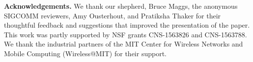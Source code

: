 
\medskip
\noindent
\textbf{Acknowledgements.} We thank our shepherd, Bruce Maggs, the anonymous
SIGCOMM reviewers, Amy Ousterhout, and Pratiksha Thaker for their thoughtful
feedback and suggestions that improved the presentation of the paper. This work
was partly supported by NSF grants CNS-1563826 and CNS-1563788. We thank the
industrial partners of the MIT Center for Wireless Networks and Mobile
Computing (Wireless@MIT) for their support.

